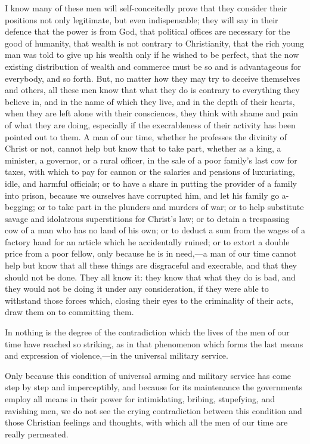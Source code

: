 \documentclass{book}
\begin{document}
I know many of these men will self-conceitedly prove that they consider their positions not only legitimate, but even indispensable; they will say in their defence that the power is from God, that political offices are necessary for the good of humanity, that wealth is not contrary to Christianity, that the rich young man was told to give up his wealth only if he wished to be perfect, that the now existing distribution of wealth and commerce must be so and is advantageous for everybody, and so forth. But, no matter how they may try to deceive themselves and others, all these men know that what they do is contrary to everything they believe in, and in the name of which they live, and in the depth of their hearts, when they are left alone with their consciences, they think with shame and pain of what they are doing, especially if the execrableness of their activity has been pointed out to them. A man of our time, whether he professes the divinity of Christ or not, cannot help but know that to take part, whether as a king, a minister, a governor, or a rural officer, in the sale of a poor family’s last cow for taxes, with which to pay for cannon or the salaries and pensions of luxuriating, idle, and harmful officials; or to have a share in putting the provider of a family into prison, because we ourselves have corrupted him, and let his family go a-begging; or to take part in the plunders and murders of war; or to help substitute savage and idolatrous superstitions for Christ’s law; or to detain a trespassing cow of a man who has no land of his own; or to deduct a sum from the wages of a factory hand for an article which he accidentally ruined; or to extort a double price from a poor fellow, only because he is in need,—a man of our time cannot help but know that all these things are disgraceful and execrable, and that they should not be done. They all know it: they know that what they do is bad, and they would not be doing it under any consideration, if they were able to withstand those forces which, closing their eyes to the criminality of their acts, draw them on to committing them.

In nothing is the degree of the contradiction which the lives of the men of our time have reached so striking, as in that phenomenon which forms the last means and expression of violence,—in the universal military service.

Only because this condition of universal arming and military service has come step by step and imperceptibly, and because for its maintenance the governments employ all means in their power for intimidating, bribing, stupefying, and ravishing men, we do not see the crying contradiction between this condition and those Christian feelings and thoughts, with which all the men of our time are really permeated.
\end{document}
